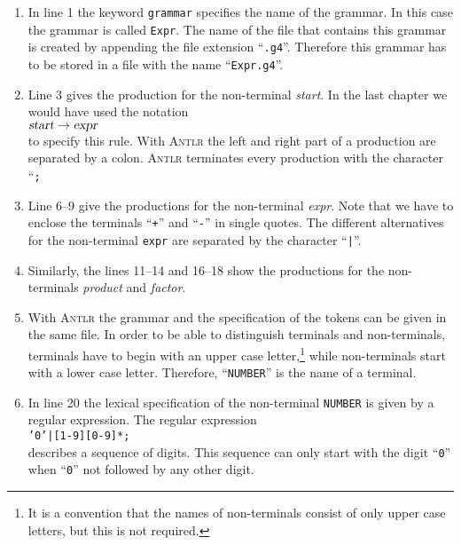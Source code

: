 \begin{enumerate}
\item In line 1 the keyword \texttt{grammar} specifies the name of the grammar.
      In this case the grammar is called \texttt{Expr}.  The name of the file that contains this grammar is
      created by appending the file extension  ``\texttt{.g4}''.  Therefore this grammar 
      has to be stored in a file with the name ``\texttt{Expr.g4}''.
\item Line 3 gives the production for the non-terminal \textsl{start}.  In the last chapter we would have used the
      notation \\[0.2cm]
      \hspace*{1.3cm}
      $\textsl{start} \rightarrow \textsl{expr}$
      \\[0.2cm]
      to specify this rule.  With \textsc{Antlr} the left and right part of a production are separated by a colon.
      \textsc{Antlr} terminates every production with the character ``\texttt{;}
\item Line 6--9 give the productions for the non-terminal \textsl{expr}.  Note that we have to enclose the 
      terminals ``\texttt{+}'' and ``\texttt{-}'' in single quotes.  The different alternatives for the non-terminal
      \texttt{expr} are separated by the character ``\texttt{|}''.
\item Similarly, the lines 11--14 and 16--18 show the productions for the non-terminals \textsl{product} and
      \textsl{factor}.   
\item With \textsc{Antlr} the grammar and the specification of the tokens can be given in the same file.
      In order to be able to distinguish terminals and non-terminals, terminals have to begin with an upper case 
      letter,\footnote
      {It is a convention that the names of non-terminals consist of only upper case letters, but this is not required.}
      while non-terminals start with a lower case letter.   Therefore, ``\texttt{NUMBER}'' is the name
      of a terminal.
\item In line 20 the lexical specification of the non-terminal \texttt{NUMBER} is given
      by a regular expression.  The regular expression
      \\[0.2cm]
      \hspace*{1.3cm}
      \texttt{'0'|[1-9][0-9]*;}
      \\[0.2cm]
      describes a sequence of digits.  This sequence can only start with the digit
      ``\texttt{0}'' when ``\texttt{0}'' not followed by any other digit.


\end{enumerate}
